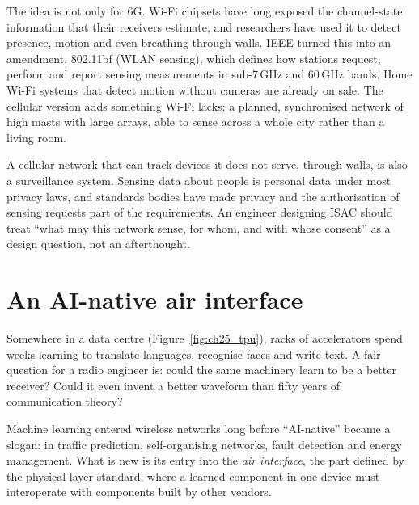 \begin{inpractice}
The idea is not only for 6G. Wi-Fi chipsets have long exposed the channel-state information that
their receivers estimate, and researchers have used it to detect presence, motion and even breathing
through walls. IEEE turned this into an amendment, 802.11bf (WLAN sensing), which defines how
stations request, perform and report sensing measurements in sub-7\,GHz and 60\,GHz bands. Home
Wi-Fi systems that detect motion without cameras are already on sale. The cellular version adds
something Wi-Fi lacks: a planned, synchronised network of high masts with large arrays, able to
sense across a whole city rather than a living room.
\end{inpractice}

\begin{pitfall}
A cellular network that can track devices it does not serve, through walls, is also a surveillance
system. Sensing data about people is personal data under most privacy laws, and standards bodies have
made privacy and the authorisation of sensing requests part of the requirements. An engineer designing
ISAC should treat ``what may this network sense, for whom, and with whose consent'' as a design
question, not an afterthought.
\end{pitfall}


\section{An AI-native air interface}
\label{sec:ch25:ai}

Somewhere in a data centre (Figure~\ref{fig:ch25_tpu}), racks of accelerators spend weeks learning
to translate languages, recognise faces and write text. A fair question for a radio engineer is:
could the same machinery learn to be a better receiver? Could it even invent a better waveform than
fifty years of communication theory?

Machine learning entered wireless networks long before ``AI-native'' became a slogan: in traffic
prediction, self-organising networks, fault detection and energy management. What is new is its
entry into the \emph{air interface}, the part defined by the physical-layer standard, where a learned
component in one device must interoperate with components built by other vendors.

